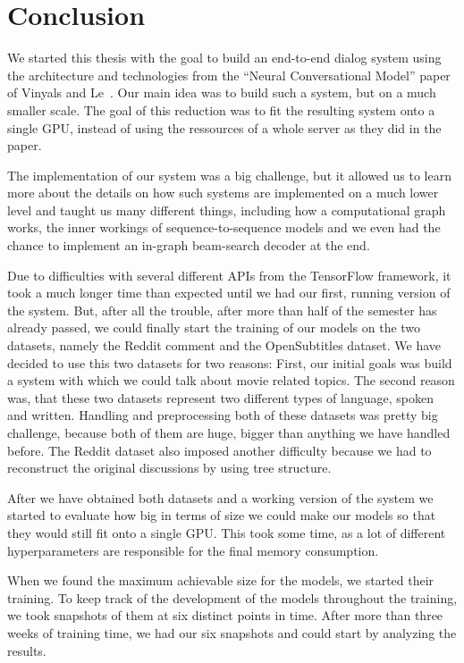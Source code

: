\chapter{Conclusion}

We started this thesis with the goal to build an end-to-end dialog system using the architecture and technologies from the ``Neural Conversational Model'' paper of Vinyals and Le~\cite{Vinyals:2015}. Our main idea was to build such a system, but on a much smaller scale. The goal of this reduction was to fit the resulting system onto a single GPU, instead of using the ressources of a whole server as they did in the paper.

The implementation of our system was a big challenge, but it allowed us to learn more about the details on how such systems are implemented on a much lower level and taught us many different things, including how a computational graph works, the inner workings of sequence-to-sequence models and we even had the chance to implement an in-graph beam-search decoder at the end.

Due to difficulties with several different APIs from the TensorFlow framework, it took a much longer time than expected until we had our first, running version of the system. But, after all the trouble, after more than half of the semester has already passed, we could finally start the training of our models on the two datasets, namely the Reddit comment and the OpenSubtitles dataset. We have decided to use this two datasets for two reasons: First, our initial goals was build a system with which we could talk about movie related topics. The second reason was, that these two datasets represent two different types of language, spoken and written. Handling and preprocessing both of these datasets was pretty big challenge, because both of them are huge, bigger than anything we have handled before. The Reddit dataset also imposed another difficulty because we had to reconstruct the original discussions by using tree structure.

After we have obtained both datasets and a working version of the system we started to evaluate how big in terms of size we could make our models so that they would still fit onto a single GPU. This took some time, as a lot of different hyperparameters are responsible for the final memory consumption.

When we found the maximum achievable size for the models, we started their training. To keep track of the development of the models throughout the training, we took snapshots of them at six distinct points in time. After more than three weeks of training time, we had our six snapshots and could start by analyzing the results.

